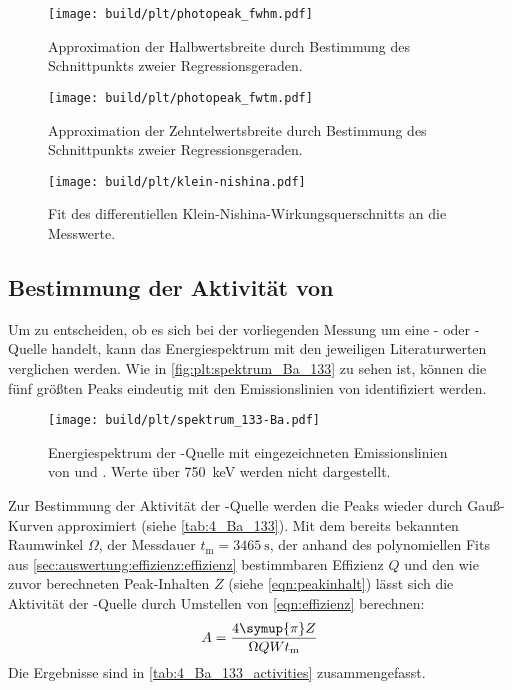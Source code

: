 \begin{figure}
    \centering
    \texttt{[image: build/plt/photopeak\_fwhm.pdf]}
    \caption{Approximation der Halbwertsbreite durch Bestimmung des Schnittpunkts zweier Regressionsgeraden.}
    \label{fig:plt:photopeak_fwhm}
\end{figure}

\begin{figure}
    \centering
    \texttt{[image: build/plt/photopeak\_fwtm.pdf]}
    \caption{Approximation der Zehntelwertsbreite durch Bestimmung des Schnittpunkts zweier Regressionsgeraden.}
    \label{fig:plt:photopeak_fwtm}
\end{figure}

\begin{figure}
    \centering
    \texttt{[image: build/plt/klein-nishina.pdf]}
    \caption{Fit des differentiellen Klein-Nishina-Wirkungsquerschnitts an die Messwerte.}
    \label{fig:plt:klein_nishina}
\end{figure}


\FloatBarrier
\subsection{Bestimmung der Aktivität von } \label{sec:auswertung:Ba_133}
Um zu entscheiden,
ob es sich bei der vorliegenden Messung um eine - oder -Quelle handelt,
kann das Energiespektrum mit den jeweiligen Literaturwerten verglichen werden.
Wie in \autoref{fig:plt:spektrum_Ba_133} zu sehen ist,
können die fünf größten Peaks eindeutig mit den Emissionslinien von  identifiziert werden.

\begin{figure}
    \centering
    \texttt{[image: build/plt/spektrum\_133-Ba.pdf]}
    \caption{
        Energiespektrum der -Quelle mit eingezeichneten Emissionslinien von  und .
        Werte über \SI{750}{\kilo\electronvolt} werden nicht dargestellt.
    }
    \label{fig:plt:spektrum_Ba_133}
\end{figure}

Zur Bestimmung der Aktivität der -Quelle
werden die Peaks wieder durch Gauß-Kurven approximiert
    (siehe \autoref{tab:4_Ba_133}).
Mit
    dem bereits bekannten Raumwinkel $\Omega$,
    der Messdauer $t_\text{m} = \SI{3465}{\second}$,
    der anhand des polynomiellen Fits aus \autoref{sec:auswertung:effizienz:effizienz} bestimmbaren Effizienz $Q$
    und den wie zuvor berechneten Peak-Inhalten $Z$ (siehe \autoref{eqn:peakinhalt})
lässt sich die Aktivität der -Quelle durch Umstellen von \autoref{eqn:effizienz} berechnen:
\begin{equation}
    A = \frac{4 \symup{\pi} Z}{\Omega Q W t_\text{m}}
\end{equation}
Die Ergebnisse sind in \autoref{tab:4_Ba_133_activities} zusammengefasst.

